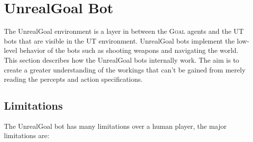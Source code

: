 \documentclass[11pt,a4paper]{article}
\newcommand{\Goal}{\textsc{Goal}}
\begin{document}
%
%
%
\section{UnrealGoal Bot}\label{sec:unrealgoalbot}
%
The UnrealGoal environment is a layer in between the {\Goal} agents and the UT bots that are visible in the UT environment. UnrealGoal bots implement the low-level behavior of the bots such as shooting weapons and navigating the world. This section describes how the UnrealGoal bots internally work. The aim is to create a greater understanding of the workings that can't be gained from merely reading the percepts and action specifications.







\subsection{Limitations}
The UnrealGoal bot has many limitations over a human player, the major limitations are:
\end{document}
